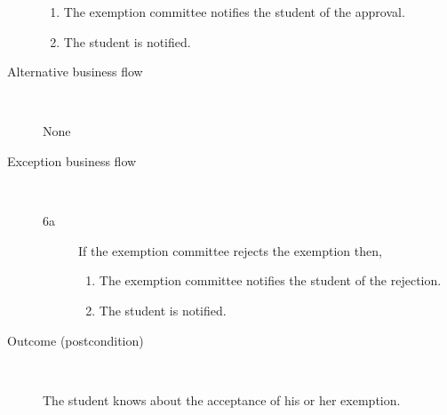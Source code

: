 \begin{description}
\begin{enumerate}
	  	\item The exemption committee notifies the student of the approval.
	  	\item The student is notified.
	\end{enumerate}
	\item[Alternative business flow] \ 
		\par None
	\item[Exception business flow] \ 
	\begin{description}
		\item[6a]  If the exemption committee rejects the exemption then,
		\begin{enumerate}
		  \item The exemption committee notifies the student of the rejection.
		  \item The student is notified.
		\end{enumerate}
	\end{description}
	\item[Outcome (postcondition)] \ 
		\par The student knows about the acceptance of his or her exemption. 
\end{description}
